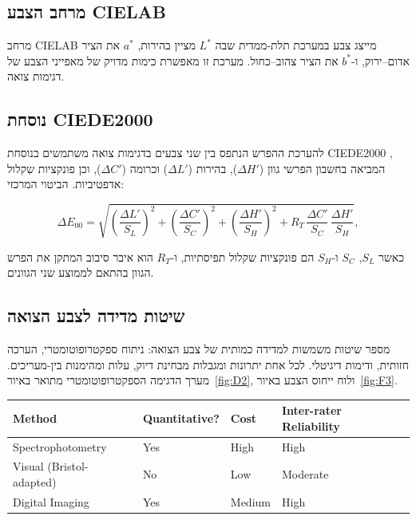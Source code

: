 \subsection{\texthebrew{מרחב הצבע \textenglish{CIELAB}}}

\begin{hebrew}מרחב \textenglish{CIELAB} מייצג צבע במערכת תלת-ממדית שבה $L^*$ מציין בהירות, $a^*$ את הציר אדום--ירוק, ו-$b^*$ את הציר צהוב--כחול. מערכת זו מאפשרת כימות מדויק של מאפייני הצבע של דגימות צואה.\end{hebrew}

\subsection{\texthebrew{נוסחת \textenglish{CIEDE2000}}}

\begin{hebrew}להערכת ההפרש הנתפס בין שני צבעים בדגימות צואה משתמשים בנוסחת \textenglish{CIEDE2000} \cite{luo2001}, המביאה בחשבון הפרשי גוון ($\Delta H'$), בהירות ($\Delta L'$) וכרומה ($\Delta C'$), וכן פונקציות שִקלול אדפטיביות. הביטוי המרכזי:\end{hebrew}

$$\Delta E_{00} = \sqrt{\left(\frac{\Delta L'}{S_L}\right)^2 + \left(\frac{\Delta C'}{S_C}\right)^2 + \left(\frac{\Delta H'}{S_H}\right)^2 + R_T\,\frac{\Delta C'}{S_C}\,\frac{\Delta H'}{S_H}},$$

\begin{hebrew}כאשר $S_L$, $S_C$ ו-$S_H$ הם פונקציות שקלול תפיסתיות, ו-$R_T$ הוא איבר סיבוב המתקן את הפרש הגוון בהתאם לממוצע שני הגוונים.\end{hebrew}

\subsection{\texthebrew{שיטות מדידה לצבע הצואה}}

\begin{hebrew}מספר שיטות משמשות למדידה כמותית של צבע הצואה: ניתוח ספקטרופוטומטרי, הערכה חזותית, ודימות דיגיטלי. לכל אחת יתרונות ומגבלות מבחינת דיוק, עלות ומהימנות בין-מעריכים. מערך הדגימה הספקטרופוטומטרי מתואר באיור~\ref{fig:D2}, ולוח ייחוס הצבע באיור~\ref{fig:F3}.\end{hebrew}

\begin{table}[h]\centering\small
\setlength{\tabcolsep}{3pt}
\begin{tabular}{llll}
\toprule
\textenglish{Method} & \textenglish{Quantitative?} & \textenglish{Cost} & \textenglish{Inter-rater Reliability} \\
\midrule
\textenglish{Spectrophotometry} & \textenglish{Yes} & \textenglish{High} & \textenglish{High} \\
\textenglish{Visual (Bristol-adapted)} & \textenglish{No} & \textenglish{Low} & \textenglish{Moderate} \\
\textenglish{Digital Imaging} & \textenglish{Yes} & \textenglish{Medium} & \textenglish{High} \\
\bottomrule
\end{tabular}
\end{table}

